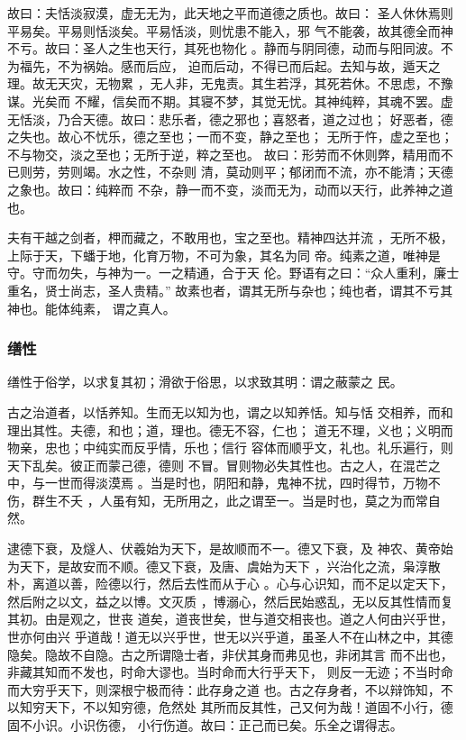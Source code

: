 \documentclass[]{article}
\begin{document}
故曰：夫恬淡寂漠，虚无无为，此天地之平而道德之质也。故曰：
圣人休休焉则平易矣。平易则恬淡矣。平易恬淡，则忧患不能入，邪
气不能袭，故其德全而神不亏。故曰：圣人之生也天行，其死也物化
。静而与阴同德，动而与阳同波。不为福先，不为祸始。感而后应，
迫而后动，不得已而后起。去知与故，遁天之理。故无天灾，无物累
，无人非，无鬼责。其生若浮，其死若休。不思虑，不豫谋。光矣而
不耀，信矣而不期。其寝不梦，其觉无忧。其神纯粹，其魂不罢。虚
无恬淡，乃合天德。故曰：悲乐者，德之邪也；喜怒者，道之过也；
好恶者，德之失也。故心不忧乐，德之至也；一而不变，静之至也；
无所于忤，虚之至也；不与物交，淡之至也；无所于逆，粹之至也。
故曰：形劳而不休则弊，精用而不已则劳，劳则竭。水之性，不杂则
清，莫动则平；郁闭而不流，亦不能清；天德之象也。故曰：纯粹而
不杂，静一而不变，淡而无为，动而以天行，此养神之道也。

夫有干越之剑者，柙而藏之，不敢用也，宝之至也。精神四达并流
，无所不极，上际于天，下蟠于地，化育万物，不可为象，其名为同
帝。纯素之道，唯神是守。守而勿失，与神为一。一之精通，合于天
伦。野语有之曰：``众人重利，廉士重名，贤士尚志，圣人贵精。''
故素也者，谓其无所与杂也；纯也者，谓其不亏其神也。能体纯素， 谓之真人。

\hypertarget{header-n781}{%
\subsubsection{缮性}\label{header-n781}}

缮性于俗学，以求复其初；滑欲于俗思，以求致其明：谓之蔽蒙之 民。

古之治道者，以恬养知。生而无以知为也，谓之以知养恬。知与恬
交相养，而和理出其性。夫德，和也；道，理也。德无不容，仁也；
道无不理，义也；义明而物亲，忠也；中纯实而反乎情，乐也；信行
容体而顺乎文，礼也。礼乐遍行，则天下乱矣。彼正而蒙己德，德则
不冒。冒则物必失其性也。古之人，在混芒之中，与一世而得淡漠焉
。当是时也，阴阳和静，鬼神不扰，四时得节，万物不伤，群生不夭
，人虽有知，无所用之，此之谓至一。当是时也，莫之为而常自然。

逮德下衰，及燧人、伏羲始为天下，是故顺而不一。德又下衰，及
神农、黄帝始为天下，是故安而不顺。德又下衰，及唐、虞始为天下
，兴治化之流，枭淳散朴，离道以善，险德以行，然后去性而从于心
。心与心识知，而不足以定天下，然后附之以文，益之以博。文灭质
，博溺心，然后民始惑乱，无以反其性情而复其初。由是观之，世丧
道矣，道丧世矣，世与道交相丧也。道之人何由兴乎世，世亦何由兴
乎道哉！道无以兴乎世，世无以兴乎道，虽圣人不在山林之中，其德
隐矣。隐故不自隐。古之所谓隐士者，非伏其身而弗见也，非闭其言
而不出也，非藏其知而不发也，时命大谬也。当时命而大行乎天下，
则反一无迹；不当时命而大穷乎天下，则深根宁极而待：此存身之道
也。古之存身者，不以辩饰知，不以知穷天下，不以知穷德，危然处
其所而反其性，己又何为哉！道固不小行，德固不小识。小识伤德，
小行伤道。故曰：正己而已矣。乐全之谓得志。
\end{document}
